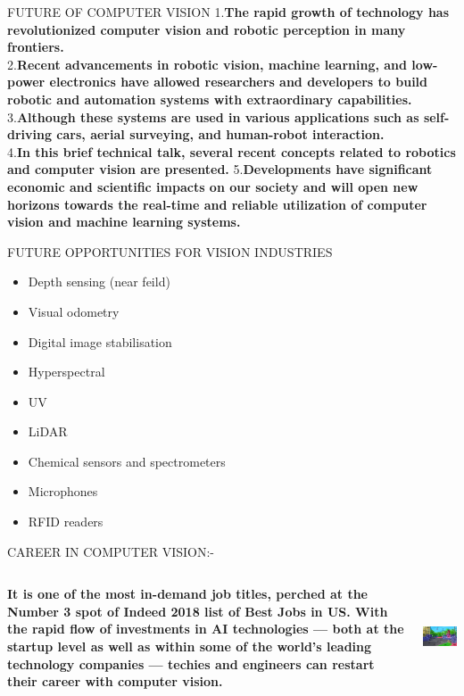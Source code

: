 \documentclass{beamer}
\begin{document}
\begin{frame}{FUTURE OF COMPUTER VISION}
\textrm{1.}\textbf{The rapid growth of technology has revolutionized computer vision and robotic perception in many frontiers.}\\
\textrm{2.}\textbf{Recent advancements in robotic vision, machine learning, and low-power electronics have allowed researchers and developers to build robotic and automation systems with extraordinary capabilities.}\\
\textrm{3.}\textbf{Although these systems are used in various applications such as self-driving cars, aerial surveying, and human-robot interaction.} \\
\textrm{4.}\textbf{In this brief technical talk, several recent concepts related to robotics and computer vision are presented.}
\textrm{5.}\textbf{Developments have significant economic and scientific impacts on our society and will open new horizons towards the real-time and reliable utilization of computer vision and machine learning systems. }
\end{frame}

\begin{frame}{FUTURE OPPORTUNITIES FOR VISION INDUSTRIES}
\begin{itemize}
\item Depth sensing (near feild)
\item Visual odometry
\item Digital image stabilisation
\item Hyperspectral
\item UV
\item LiDAR
\item Chemical sensors and spectrometers
\item Microphones
\item RFID readers
\end{itemize}

\end{frame}

\begin{frame}{CAREER IN COMPUTER VISION:-}
\begin{columns}[T]
\begin{column}[T]{5cm} 
\textbf{It is one of the most in-demand job titles, perched at the Number 3 spot of Indeed 2018 list of Best Jobs in US. With the rapid flow of investments in AI technologies — both at the startup level as well as within some of the world’s leading technology companies — techies and engineers can restart their career with computer vision.}
\end{column}
\begin{column}[T]{5cm}
\includegraphics[height=3cm]{deeplearning.jpg}
\end{column}
\end{columns}
\end{frame}
\end{document}
